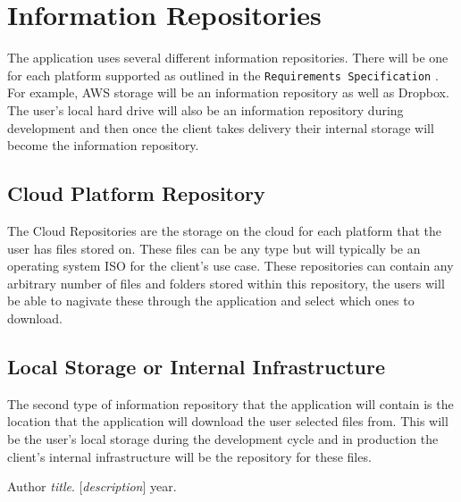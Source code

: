 \documentclass{article}
\begin{document}
\section{Information Repositories}
The application uses several different information repositories. There will be one for each platform supported as
outlined in the \texttt{Requirements Specification} \cite{reqs}. For example, AWS storage will be an information
repository as well as Dropbox. The user's local hard drive will also be an information repository during
development and then once the client takes delivery their internal storage will become the information repository.

    \subsection{Cloud Platform Repository}
    The Cloud Repositories are the storage on the cloud for each platform that the user has files stored on.
    These files can be any type but will typically be an operating system ISO for the client's use case. These
    repositories can contain any arbitrary number of files and folders stored within this repository, the users
    will be able to nagivate these through the application and select which ones to download.
    
    \subsection{Local Storage or Internal Infrastructure}
    The second type of information repository that the application will contain is the location that the
    application will download the user selected files from. This will be the user's local storage during the
    development cycle and in production the client's internal infrastructure will be the repository for these
    files.

\newpage
\begin{thebibliography}{1}
Author
\textit{title}.
[\textit{description}] year.
\end{thebibliography}

\end{document}
